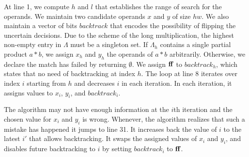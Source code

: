 At line 1, we compute $h$ and $l$ that establishes the range of search for
the operands.
%
We maintain two candidate operands $x$ and $y$ of size $hw$.
%
We also maintain a vector of bits $backtrack$ that encodes 
the possibility of flipping the uncertain decisions.
%
Due to the scheme of the long multiplication, the highest
non-empty entry in $\Lambda$ must be a singleton set.
%
If $\Lambda_h$ contains a single partial product $a*b$,
we assign $x_h$ and $y_h$ the operands of $a*b$ arbitrarily.
%
Otherwise, we declare the match has failed by returning $\emptyset$.
%
We assign $\mathbf{ff}$ to $backtrack_h$, which states that
no need of backtracking at index $h$.
%
The loop at line 8 iterates over index $i$ starting from $h$ and decreases
$i$ in each iteration.
%
In each iteration, it assigns values to $x_i$, $y_i$, and $backtrack_i$. 
%

The algorithm may not have enough information at the $i$th iteration
and the chosen value for $x_i$ and $y_i$ is wrong.
%
Whenever, the algorithm realizes that such a mistake has happened
it jumps to line 31.
%
It increases back the value of $i$ to the latest $i'$ that allows
backtracking.
%
It swaps the assigned values of $x_i$ and $y_i$, and disables future
backtracking to $i$ by setting $backtrack_i$ to
$\mathbf{ff}$.
%

